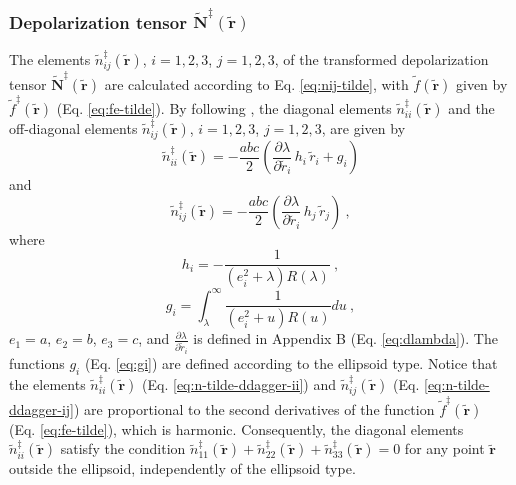 \documentclass[gmd, manuscript]{copernicus}
\begin{document}
\subsubsection{Depolarization tensor $\tilde{\mathbf{N}}^{\ddagger}(\tilde{\mathbf{r}})$}


The elements $\tilde{n}^{\ddagger}_{ij}(\tilde{\mathbf{r}})$,
$i = 1, 2, 3$, $j = 1, 2, 3$, of the transformed depolarization tensor
$\tilde{\mathbf{N}}^{\ddagger}(\tilde{\mathbf{r}})$
are calculated according to Eq. \ref{eq:nij-tilde}, with
$\tilde{f}(\tilde{\mathbf{r}})$ given by $\tilde{f}^{\ddagger}(\tilde{\mathbf{r}})$
(Eq. \ref{eq:fe-tilde}).
By following \citet{clark1986}, the diagonal elements
$\tilde{n}^{\ddagger}_{ii}(\tilde{\mathbf{r}})$
and the off-diagonal elements
$\tilde{n}^{\ddagger}_{ij}(\tilde{\mathbf{r}})$, $i = 1, 2, 3$,
$j = 1, 2, 3$, are given by
\begin{equation}
\tilde{n}^{\ddagger}_{ii}(\tilde{\mathbf{r}}) =
-\frac{abc}{2}
\left( \frac{\partial \lambda}{\partial \tilde{r}_{i}} \, h_{i} \, \tilde{r}_{i}
+ g_{i} \right)
\label{eq:n-tilde-ddagger-ii}
\end{equation}
and
\begin{equation}
\tilde{n}^{\ddagger}_{ij}(\tilde{\mathbf{r}}) =
-\frac{abc}{2} \left(
\frac{\partial \lambda}{\partial \tilde{r}_{i}} \, h_{j} \, \tilde{r}_{j}
\right) \: ,
\label{eq:n-tilde-ddagger-ij}
\end{equation}
where
\begin{equation}
h_{i} = -\frac{1}{\left( e_{i}^{2} + \lambda \right) R(\lambda)} \: ,
\label{eq:hi}
\end{equation}
\begin{equation}
g_{i} = \int_{\lambda}^{\infty} \frac{1}{\left( e_{i}^{2} + u \right) R(u)} du \: ,
\label{eq:gi}
\end{equation}
$e_{1} = a$, $e_{2} = b$, $e_{3} = c$, and
$\frac{\partial \lambda}{\partial \tilde{r}_{i}}$
is defined in Appendix B (Eq. \ref{eq:dlambda}).
The functions $g_{i}$ (Eq. \ref{eq:gi}) are defined according
to the ellipsoid type.
Notice that the elements $\tilde{n}^{\ddagger}_{ii}(\tilde{\mathbf{r}})$
(Eq. \ref{eq:n-tilde-ddagger-ii}) and
$\tilde{n}^{\ddagger}_{ij}(\tilde{\mathbf{r}})$
(Eq. \ref{eq:n-tilde-ddagger-ij})
are proportional to the second derivatives of the function
$\tilde{f}^{\ddagger}(\tilde{\mathbf{r}})$ (Eq. \ref{eq:fe-tilde}),
which is harmonic. Consequently, the diagonal elements
$\tilde{n}^{\ddagger}_{ii}(\tilde{\mathbf{r}})$ satisfy the condition
$\tilde{n}^{\ddagger}_{11}(\tilde{\mathbf{r}}) +
\tilde{n}^{\ddagger}_{22}(\tilde{\mathbf{r}}) +
\tilde{n}^{\ddagger}_{33}(\tilde{\mathbf{r}}) = 0$ for any
point $\tilde{\mathbf{r}}$ outside the ellipsoid, independently
of the ellipsoid type.
\end{document}
